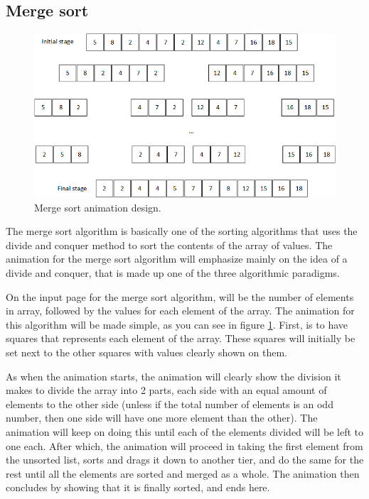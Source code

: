 \newpage

\subsection{Merge sort}

\begin{figure}[H]
\centering
\includegraphics[scale=0.9]{images/report_images/animationDesignMergeSort.png}
\caption{Merge sort animation design.}
\label{animationDesignMergeSort}
\end{figure}

The merge sort algorithm is basically one of the sorting algorithms that uses the divide and conquer method to sort the contents of the array of values. The animation for the merge sort algorithm will emphasize mainly on the idea of a divide and conquer, that is made up one of the three algorithmic paradigms. 

On the input page for the merge sort algorithm, will be the number of elements in array, followed by the values for each element of the array. The animation for this algorithm will be made simple, as you can see in figure \ref{animationDesignMergeSort}. First, is to have squares that represents each element of the array. These squares will initially be set next to the other squares with values clearly shown on them.

As when the animation starts, the animation will clearly show the division it makes to divide the array into 2 parts, each side with an equal amount of elements to the other side (unless if the total number of elements is an odd number, then one side will have one more element than the other). The animation will keep on doing this until each of the elements divided will be left to one each. After which, the animation will proceed in taking the first element from the unsorted list, sorts and drags it down to another tier, and do the same for the rest until all the elements are sorted and merged as a whole. The animation then concludes by showing that it is finally sorted, and ends here.

